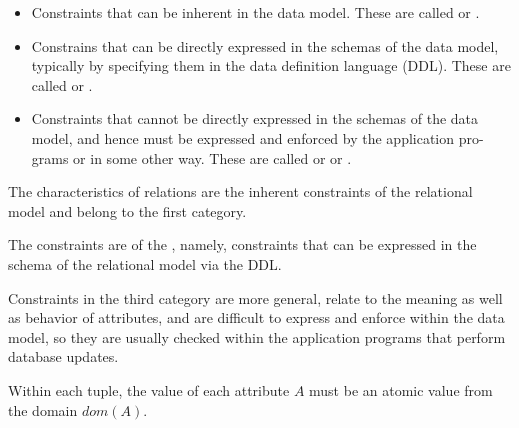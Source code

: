   \begin{itemize}
    \item Constraints that can be inherent in the data model. These are called  or .
    \item Constrains that can be directly expressed in the schemas of the data model, typically by specifying them in the data definition language (DDL). These are called  or .
    \item Constraints that cannot be directly expressed in the schemas of the data model, and hence must be expressed and enforced by the application pro-grams or in some other way. These are called  or  or .
  \end{itemize}

  \par The characteristics of relations are the inherent constraints of the relational model and belong to the first category.
  \par The constraints  are of the , namely, constraints
that can be expressed in the schema of the relational model via the DDL.
  \par Constraints in the third category are more general, relate to the meaning as well as behavior of attributes, and are difficult to express and enforce within the data model, so they are
usually checked within the application programs that perform database updates.

    \par Within each tuple, the value of each attribute $A$ must be an atomic value from the domain $dom(A)$.

